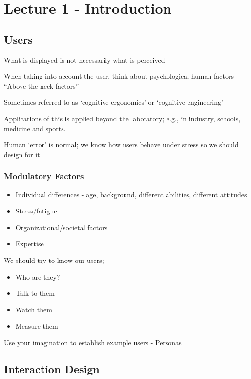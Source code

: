 \documentclass[]{project_plan}
\begin{document}
\tableofcontents{}\newpage


\chapter{Lecture 1 - Introduction}

\section{Users}
What is displayed is not necessarily what is perceived

When taking into account the user, think about psychological human factors\\
“Above the neck factors”

Sometimes referred to as ‘cognitive ergonomics’ or ‘cognitive engineering’

Applications of this is applied beyond the laboratory; e.g., in industry,
schools, medicine and sports.

Human ‘error’ is normal; we know how users behave under stress so we should
design for it

\subsection{Modulatory Factors}

\begin{itemize}
  \item Individual differences - age, background, different abilities, different attitudes
  \item Stress/fatigue
  \item Organizational/societal factors
  \item Expertise
\end{itemize}

We should try to know our users;
\begin{itemize}
  \item Who are they?
  \item Talk to them
  \item Watch them
  \item Measure them
\end{itemize}

Use your imagination to establish example users - Personas

\section{Interaction Design}
\end{document}
